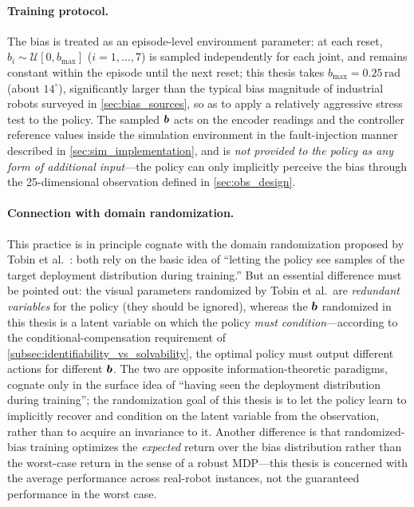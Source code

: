 \paragraph{Training protocol.} The bias is treated as an episode-level environment parameter: at each reset, $b_i \sim \mathcal{U}[0, b_{\max}]$ ($i = 1, \dots, 7$) is sampled independently for each joint, and remains constant within the episode until the next reset; this thesis takes $b_{\max} = 0.25\,\text{rad}$ (about $14^\circ$), significantly larger than the typical bias magnitude of industrial robots surveyed in \cref{sec:bias_sources}, so as to apply a relatively aggressive stress test to the policy. The sampled $\bm{b}$ acts on the encoder readings and the controller reference values inside the simulation environment in the fault-injection manner described in \cref{sec:sim_implementation}, and is \emph{not provided to the policy as any form of additional input}---the policy can only implicitly perceive the bias through the 25-dimensional observation defined in \cref{sec:obs_design}.

\paragraph{Connection with domain randomization.} This practice is in principle cognate with the domain randomization proposed by Tobin et al.~\cite{tobin2017domain}: both rely on the basic idea of ``letting the policy see samples of the target deployment distribution during training.'' But an essential difference must be pointed out: the visual parameters randomized by Tobin et al.\ are \emph{redundant variables} for the policy (they should be ignored), whereas the $\bm{b}$ randomized in this thesis is a latent variable on which the policy \emph{must condition}---according to the conditional-compensation requirement of \cref{subsec:identifiability_vs_solvability}, the optimal policy must output different actions for different $\bm{b}$. The two are opposite information-theoretic paradigms, cognate only in the surface idea of ``having seen the deployment distribution during training''; the randomization goal of this thesis is to let the policy learn to implicitly recover and condition on the latent variable from the observation, rather than to acquire an invariance to it. Another difference is that randomized-bias training optimizes the \emph{expected} return over the bias distribution rather than the worst-case return in the sense of a robust MDP---this thesis is concerned with the average performance across real-robot instances, not the guaranteed performance in the worst case.

